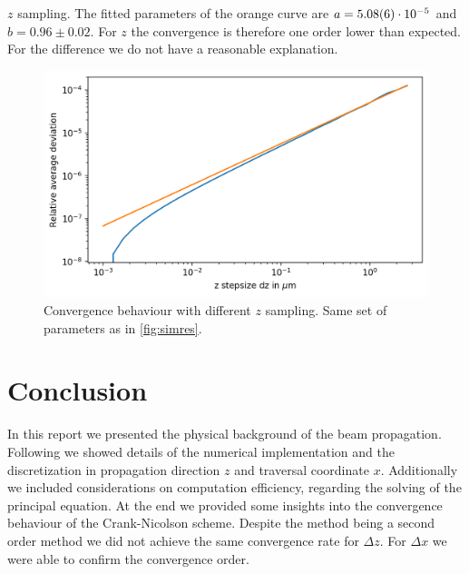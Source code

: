 \documentclass[a4paper,12pt]{scrartcl}
\begin{document}
        $z$ sampling. The fitted parameters of the orange curve are $a=\SI{5.08\pm0.06e-5}{}$ and $b = 0.96 \pm 0.02$. For $z$ the convergence is therefore one order lower than expected. For the difference we do not have a reasonable explanation.
        \begin{figure}[H]
            \centering
            \includegraphics[width=.8\textwidth]{figures/fit_z.png}
            \caption{Convergence behaviour with different $z$ sampling.
            Same set of parameters as in \autoref{fig:simres}.}
            \label{fig:simfitz}
        \end{figure}
        
        
\section{Conclusion}
    In this report we presented the physical background of the beam propagation. Following we showed details of the numerical implementation
    and the discretization in propagation direction $z$ and traversal coordinate $x$. 
    Additionally we included considerations on computation efficiency, regarding the solving of the principal equation.
    At the end we provided some insights into the convergence behaviour of the Crank-Nicolson scheme. Despite the method being a second order method we did not achieve the same convergence rate for $\Delta z$. For $\Delta x$  we were able to confirm the convergence order.
    
\newpage
\nocite{*}
\printbibliography
\end{document}
